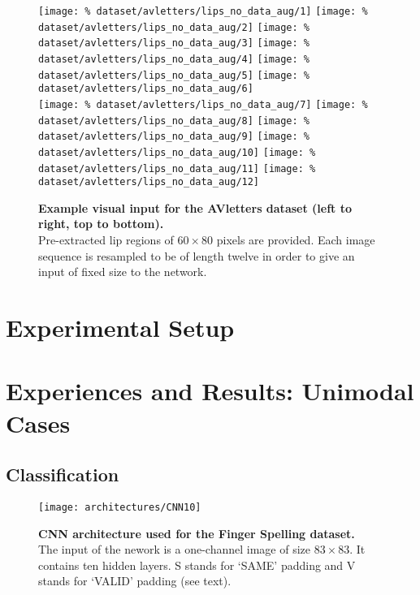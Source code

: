 \begin{figure}[H]
  \centering
  \texttt{[image: \%
    dataset/avletters/lips\_no\_data\_aug/1]}
  \texttt{[image: \%
    dataset/avletters/lips\_no\_data\_aug/2]}
  \texttt{[image: \%
    dataset/avletters/lips\_no\_data\_aug/3]}
  \texttt{[image: \%
    dataset/avletters/lips\_no\_data\_aug/4]}
  \texttt{[image: \%
    dataset/avletters/lips\_no\_data\_aug/5]}
  \texttt{[image: \%
    dataset/avletters/lips\_no\_data\_aug/6]}\\[0.15em]
  \texttt{[image: \%
    dataset/avletters/lips\_no\_data\_aug/7]}
  \texttt{[image: \%
    dataset/avletters/lips\_no\_data\_aug/8]}
  \texttt{[image: \%
    dataset/avletters/lips\_no\_data\_aug/9]}
  \texttt{[image: \%
    dataset/avletters/lips\_no\_data\_aug/10]}
  \texttt{[image: \%
    dataset/avletters/lips\_no\_data\_aug/11]}
  \texttt{[image: \%
    dataset/avletters/lips\_no\_data\_aug/12]}
  \caption{%
    \textbf{Example visual input for the AVletters dataset
      (left to right, top to bottom).}\\[0.1em]
    Pre-extracted lip regions of $60 \times 80$ pixels are provided.
    Each image sequence is resampled to be of length twelve in order to
    give an input of fixed size to the network.}
  \label{fig:avletters_exs}
\end{figure}

\section{Experimental Setup}

\section{Experiences and Results: Unimodal Cases}

\subsection{Classification}

\begin{figure}[H]
  \centering
  \texttt{[image: architectures/CNN10]}
  \caption{%
    \textbf{CNN architecture used for the Finger Spelling  dataset.}
      \\[0.1em]
    The input of the nework is a one-channel image of size $83 \times 83$.
    It contains ten hidden layers. S stands for `SAME' padding
    and V stands for `VALID' padding (see text).}
  \label{fig:CNN10}
\end{figure}

